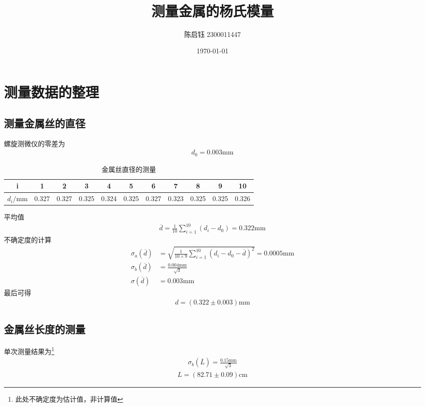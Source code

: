 \documentclass[a4paper]{ctexart}
\title{测量金属的杨氏模量}
\author{陈启钰\,\,2300011447}
\date{\today}
\begin{document}
	\maketitle
	\tableofcontents
	\section{测量数据的整理}
	\subsection{测量金属丝的直径}
	\noindent 螺旋测微仪的零差为
	\begin{align}
		d_0=0.003\mathrm{mm}
	\end{align}
	\begin{table}[H]
		\begin{center}
			\caption{金属丝直径的测量}
			\begin{tabular}{c|cccccccccc}
				i&1&2&3&4&5&6&7&8&9&10\\
				\hline
				$d_i/\mathrm{mm}$&0.327&0.327&0.325&0.324&0.325&0.327&0.323&0.325&0.325&0.326
			\end{tabular}
		\end{center}
	\end{table}
	平均值
	\begin{align}
		\overline{d}=\frac{1}{10}\sum_{i=1}^{10}(d_i-d_0)=0.322\mathrm{mm}
	\end{align}
	不确定度的计算
	\begin{align}
		\sigma_a(\overline{d})&=\sqrt{\frac{1}{10\times9}\sum_{i=1}^{10}(d_i-d_0-\overline{d})^2}=0.0005\mathrm{mm}\\
		\sigma_b(\overline{d})&=\frac{0.004\mathrm{mm}}{\sqrt{3}}\\
		\sigma(\overline{d})&=0.003\mathrm{mm}
	\end{align}
	最后可得
	\begin{align}
		d=(0.322\pm 0.003)\mathrm{mm}
	\end{align}
	\subsection{金属丝长度的测量}
	单次测量结果为\footnote{此处不确定度为估计值，非计算值}
	\begin{align}
		\sigma_b(\overline{L})=\frac{0.15\mathrm{mm}}{\sqrt{3}}
	\end{align}
	\begin{align}
		L=(82.71\pm 0.09)\mathrm{cm}
	\end{align}
\end{document}
